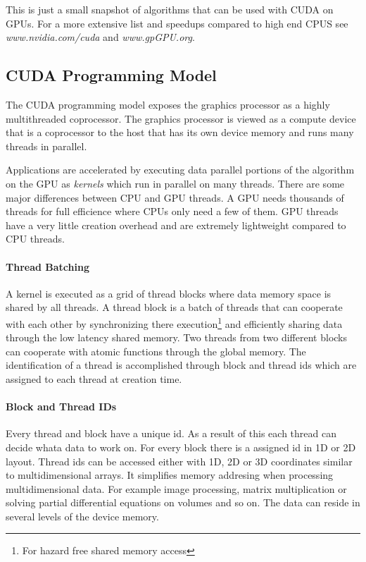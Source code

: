 This is just a small snapshot of algorithms that can be used with \gls{CUDA} on
GPUs. For a more extensive list and speedups compared to high end CPUS see
\emph{www.nvidia.com/cuda} and \emph{www.gpGPU.org}.

\subsection*{CUDA Programming Model} %
\label{sub:cuda_programming_model}
The \gls{CUDA} programming model exposes the graphics processor as a highly
multithreaded coprocessor. The graphics processor is viewed as a compute device
that is a coprocessor to the host that has its own device memory and runs many
threads in parallel.

Applications are accelerated by executing data parallel portions of the
algorithm on the \gls{GPU} as \emph{kernels} which run in parallel on
many threads. There are some major differences between CPU and \gls{GPU} threads. 
A \gls{GPU} needs thousands of threads for full efficience where \glspl{CPU} only need a few of
them. \gls{GPU} threads have a very little creation overhead and are extremely
lightweight compared to CPU threads.

\paragraph{Thread Batching} %
\label{par:thread_batching}
A kernel is executed as a grid of thread blocks where data memory space is
shared by all threads. A thread block is a batch of threads that can cooperate
with each other by synchronizing there execution\footnote{For hazard free shared
memory access} and efficiently sharing data through the low latency shared
memory. Two threads from two different blocks can cooperate with atomic 
functions through the global memory. The identification of a thread is 
accomplished through block and thread ids which are assigned to each thread at 
creation time. 

\paragraph{Block and Thread IDs} %
\label{par:block_and_thread_ids}
Every thread and block have a unique id. As a result of this each thread can
decide whata data to work on. For every block there is a assigned id in 1D or 2D
layout. Thread ids can be accessed either with 1D, 2D or 3D coordinates similar
to multidimensional arrays. It simplifies memory addresing when processing
multidimensional data. For example image processing, matrix multiplication or
solving partial differential equations on volumes and so on. The data can reside
in several levels of the device memory. 

